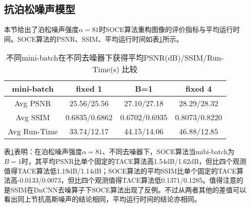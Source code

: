 \subsection{抗泊松噪声模型}
本节给出了泊松噪声强度$\alpha=81$时SOCE算法重构图像的评价指标与平均运行时间。SOCE算法的PSNR、SSIM、平均运行时间如表\ref{table:4-2}所示。
\begin{table}[!htbp]
	\def\arraystretch{1.4}\centering{}
	\caption{不同mini-batch在不同去噪器下获得平均PSNR(dB)/SSIM/Run-Time(s) 比较}
	\label{table:4-2}
	\begin{tabular*}{\linewidth}{@{}@{\extracolsep{\fill}}cccc@{}}
		\toprule
		mini-batch	& fixed 1 & B=1 & fixed 4\\ %
		\midrule
		Avg PSNR        & 25.56/25.56   & 27.10/27.18  & {\color{red}28.29}/{\color{red}28.32} \\
		Avg SSIM        & 0.6835/0.6862   & 0.6702/0.6935  & {\color{red}0.8073}/{\color{red}0.8220} \\
		Avg Run-Time    & {\color{blue}33.74}/{\color{blue}12.17}   & 44.15/14.06  &46.88/12.85 \\
		\bottomrule
	\end{tabular*}
\end{table}

表\ref{table:4-2}表明：在泊松噪声强度$\alpha=81$、不同去噪器下，SOCE算法当mibi-batch为$B=1$时，其平均PSNR比单个固定的TACE算法高1.54dB/1.62dB，但比四个观测值得TACE算法低1.19dB/1.14dB；SOCE算法的平均SSIM比单个固定的TACE算法高-0.0133/0.0073，但比四个观测值得TACE算法低0.1371/0.1285。值得注意的是SSIM在DnCNN去噪算子下SOCE算法出现了反例。不过从两者其他的差值可以看出同上节抗高斯噪声的结论相同，平均运行时间的结论亦相同。

